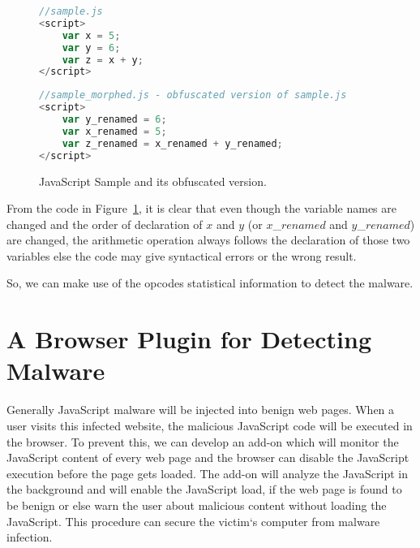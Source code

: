 \begin{figure}
  \centering

\begin{lstlisting}[language=JavaScript]
//sample.js
<script>
    var x = 5;
    var y = 6;
    var z = x + y;
</script>
\end{lstlisting}

\begin{lstlisting}[language=JavaScript]
//sample_morphed.js - obfuscated version of sample.js
<script>
    var y_renamed = 6;
    var x_renamed = 5;
    var z_renamed = x_renamed + y_renamed;
</script>
\end{lstlisting}

    \caption[JavaScript Sample and its obfuscated version.]{JavaScript Sample and its obfuscated version.}
\label{fig:jssample}
\end{figure}

From the code in Figure~\ref{fig:jssample}, it is clear that even though the variable names are changed and the order of declaration of $x$ and $y$  (or $x$\_$renamed$ and $y$\_$renamed$) are changed, the arithmetic operation always follows the declaration of those two variables else the code may give syntactical errors or the wrong result.

So, we can make use of the opcodes statistical information to detect the malware. 

\section{A Browser Plugin for Detecting Malware}

Generally JavaScript malware will be injected into benign web pages. When a user visits this infected website, the malicious JavaScript code will be executed in the browser. To prevent this, we can develop an add-on which will monitor the JavaScript content of every web page and the browser can disable the JavaScript execution before the page gets loaded. The add-on will analyze the JavaScript in the background and will enable the JavaScript load, if the web page is found to be benign or else warn the user about malicious content without loading the JavaScript. This procedure can secure the victim`s computer from malware infection.